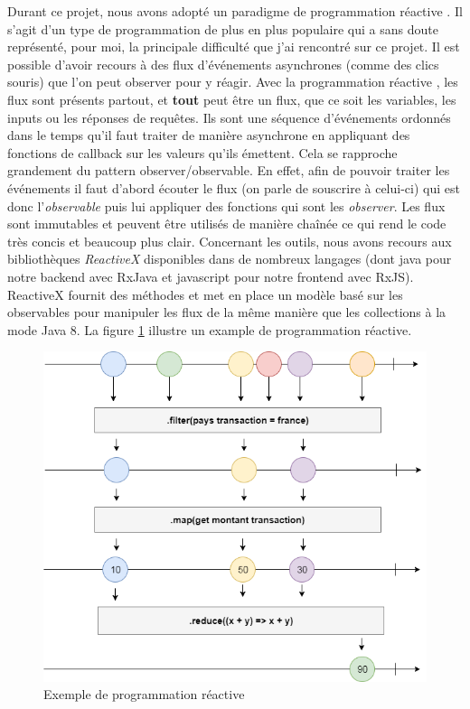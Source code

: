 	Durant ce projet, nous avons adopté un paradigme de programmation réactive \cite{bib_progReac}. Il s'agit d'un type de programmation de plus en plus populaire qui a sans doute représenté, pour moi, la principale difficulté que j'ai rencontré sur ce projet. Il est possible d'avoir recours à des flux d'événements asynchrones (comme des clics souris) que l'on peut observer pour y réagir. Avec la programmation réactive \cite{bib_progReac2}, les flux sont présents partout, et \textbf{tout} peut être un flux, que ce soit les variables, les inputs ou les réponses de requêtes. Ils sont une séquence d'événements ordonnés dans le temps qu'il faut traiter de manière asynchrone en appliquant des fonctions de callback sur les valeurs qu'ils émettent. Cela se rapproche grandement du pattern observer/observable. En effet, afin de pouvoir traiter les événements il faut d'abord écouter le flux (on parle de souscrire à celui-ci) qui est donc l'\textit{observable} puis lui appliquer des fonctions qui sont les \textit{observer}. Les flux sont immutables et peuvent être utilisés de manière chaînée ce qui rend le code très concis et beaucoup plus clair. Concernant les outils, nous avons recours aux bibliothèques \textit{ReactiveX} disponibles dans de nombreux langages (dont java pour notre backend avec RxJava et javascript pour notre frontend avec RxJS). ReactiveX fournit des méthodes et met en place un modèle basé sur les observables pour manipuler les flux de la même manière que les collections à la mode Java 8. La figure \ref{reactivex} illustre un example de programmation réactive.
	
\begin{figure}[h!]
	\includegraphics[scale=0.50]{images/travailBP1818/architecture/reactivex.png}
	\centering
	\caption{Exemple de programmation réactive}
	\label{reactivex}
\end{figure}

